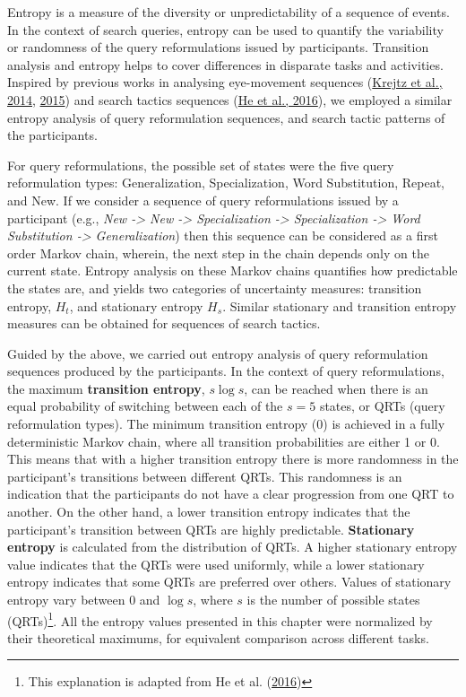 \documentclass[letterpaper, nobind]{templates/ociamthesis}
\begin{document}
Entropy is a measure of the diversity or unpredictability of a sequence of events. In the context of search queries, entropy can be used to quantify the variability or randomness of the query reformulations issued by participants.
Transition analysis and entropy helps to cover differences in disparate tasks and activities.
Inspired by previous works in analysing eye-movement sequences (\protect\hyperlink{ref-krejtz2014entropy}{Krejtz et al., 2014}, \protect\hyperlink{ref-krejtz2015gaze}{2015}) and search tactics sequences (\protect\hyperlink{ref-he2016beyond}{He et al., 2016}), we employed a similar entropy analysis of query reformulation sequences, and search tactic patterns of the participants.

For query reformulations, the possible set of states were the five query reformulation types:
Generalization, Specialization, Word Substitution, Repeat, and New.
If we consider a sequence of query reformulations issued by a participant
(e.g., \emph{New -\textgreater{} New -\textgreater{} Specialization -\textgreater{} Specialization -\textgreater{} Word Substitution -\textgreater{} Generalization})
then this sequence can be considered as a first order Markov chain, wherein, the next step in the chain depends only on the current state.
Entropy analysis on these Markov chains quantifies how predictable the states are, and yields two categories of uncertainty measures: transition entropy, \(H_t\), and stationary entropy \(H_s\).
Similar stationary and transition entropy measures can be obtained for sequences of search tactics.

Guided by the above, we carried out entropy analysis of query reformulation sequences produced by the participants.
In the context of query reformulations, the maximum \textbf{transition entropy}, \(s \log s\), can be reached when there is an equal probability of switching between each of the \(s = 5\) states, or QRTs (query reformulation types).
The minimum transition entropy (0) is achieved in a fully deterministic Markov chain, where all transition probabilities are either 1 or 0.
This means that with a higher transition entropy there is more randomness in the participant's transitions between different QRTs.
This randomness is an indication that the participants do not have a clear progression from one QRT to another.
On the other hand, a lower transition entropy indicates that the participant's transition between QRTs are highly predictable.
\textbf{Stationary entropy} is calculated from the distribution of QRTs.
A higher stationary entropy value indicates that the QRTs were used uniformly, while a lower stationary entropy indicates that some QRTs are preferred over others.
Values of stationary entropy vary between 0 and \(\log s\), where \(s\) is the number of possible states (QRTs)\footnote{This explanation is adapted from He et al. (\protect\hyperlink{ref-he2016beyond}{2016})}.
All the entropy values presented in this chapter were normalized by their theoretical maximums, for equivalent comparison across different tasks.
\end{document}
